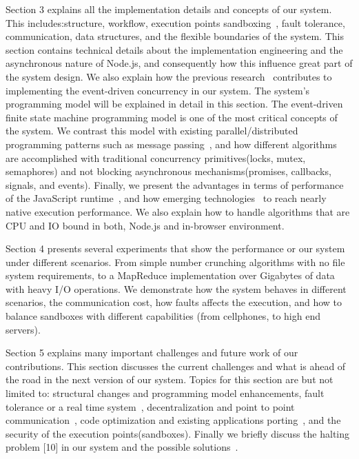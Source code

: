 \documentclass[10pt,reprint]{socc14}
\begin{document}
Section 3 explains all the implementation details and concepts of our system. This includes:structure, workflow, execution points sandboxing~\cite{Agten2012,Mckeown2008}, fault tolerance, communication, data structures, and the flexible boundaries of the system. This section contains technical details about the implementation engineering and the asynchronous nature of Node.js, and consequently  how this  influence great part of the system design. We also explain how the previous research~\cite{Haller2009} contributes to implementing the event-driven concurrency in our system. The system's programming model will be explained in detail in this section. The event-driven finite state machine programming model is one of the most critical concepts of the system. We contrast this model with existing parallel/distributed programming patterns such as message passing~\cite{GroppWilliamandLuskEwingandSkjellum1999}, and how different algorithms are accomplished with traditional concurrency primitives(locks, mutex, semaphores) and not blocking asynchronous mechanisms(promises, callbacks, signals, and events). Finally, we present the advantages in terms of performance of the JavaScript runtime~\cite{Tilkov2010}, and how emerging technologies~\cite{Herhut2013a,Yee2009} to reach nearly native execution performance. We also explain how to handle algorithms that are CPU and IO bound in both, Node.js and in-browser environment.

Section 4 presents several experiments that show the performance or our system  under different scenarios. From simple number crunching algorithms with no file system requirements, to a MapReduce implementation over Gigabytes of data with heavy I/O operations. We demonstrate how the system behaves in different scenarios, the communication cost, how faults affects the execution, and how to balance sandboxes with different capabilities (from cellphones, to high end servers).

Section 5 explains many important challenges and future work of our contributions. This section discusses the current challenges and what is ahead of the road in the next version of our system. Topics for this section are but not limited to: structural changes and programming model enhancements, fault tolerance or a real time system~\cite{Kopetz1989a}, decentralization and point to point communication~\cite{Vogt2013}, code optimization and existing applications porting~\cite{Zakai2011},  and the security of the execution points(sandboxes). Finally we briefly discuss the halting problem [10] in our system and the possible solutions~\cite{Alur1994}.
\end{document}
